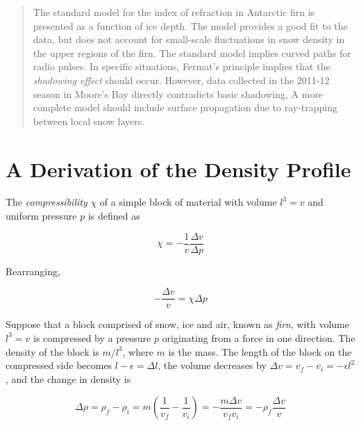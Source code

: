 \documentclass[12pt]{article}
\begin{document}
\maketitle

\begin{abstract}
The standard model for the index of refraction in Antarctic firn is presented as a function of ice depth.  The model provides a good fit to the data, but does not account for small-scale fluctuations in snow density in the upper regions of the firn.  The standard model implies curved paths for radio pulses.  In specific situations, Fermat's principle implies that the \textit{shadowing effect} should occur.  However, data collected in the 2011-12 season in Moore's Bay directly contradicts basic shadowing. A more complete model should include surface propagation due to ray-trapping between local snow layers.
\end{abstract}

\section{A Derivation of the Density Profile}

The \textit{compressibility} $\chi$ of a simple block of material with volume $l^3 = v$ and uniform pressure $p$ is defined as

\begin{equation}
\chi = -\frac{1}{v} \frac{\Delta v}{\Delta p}
\label{eq:comp1}
\end{equation}

Rearranging,

\begin{equation}
-\frac{\Delta v}{v} = \chi \Delta p
\label{eq:comp2}
\end{equation}

Suppose that a block comprised of snow, ice and air, known as \textit{firn}, with volume $l^3 = v$ is compressed by a pressure $p$ originating from a force in one direction.  The density of the block is $m/l^3$, where $m$ is the mass.  The length of the block on the compressed side becomes $l-\epsilon = \Delta l$, the volume decreases by $\Delta v = v_{ f} - v_{ i} = -\epsilon l^2$, and the change in density is

\begin{equation}
\Delta \rho = \rho_{f} - \rho_{i} = m \left( \frac{1}{v_{f}} - \frac{1}{v_{i}} \right) = -\frac{m\Delta v}{v_{f} v_{ i}} = -\rho_{f} \frac{\Delta v}{v}
\label{eq:deltarho}
\end{equation}
\end{document}
